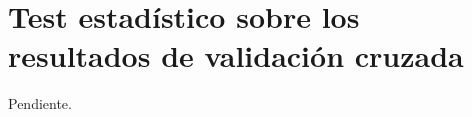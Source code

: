 \section{Test estadístico sobre los resultados de validación cruzada}
\label{sec:estadistica}

Pendiente.

